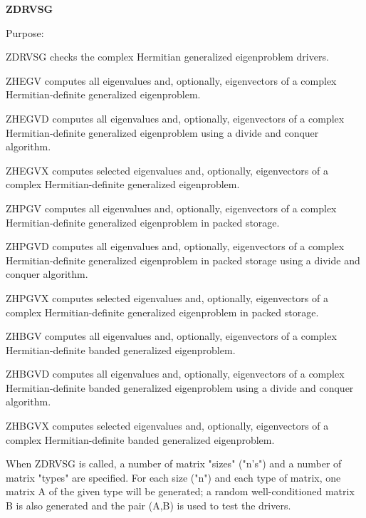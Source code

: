 {\bfseries Z\+D\+R\+V\+S\+G} 

\begin{DoxyParagraph}{Purpose\+: }
\begin{DoxyVerb}      ZDRVSG checks the complex Hermitian generalized eigenproblem
      drivers.

              ZHEGV computes all eigenvalues and, optionally,
              eigenvectors of a complex Hermitian-definite generalized
              eigenproblem.

              ZHEGVD computes all eigenvalues and, optionally,
              eigenvectors of a complex Hermitian-definite generalized
              eigenproblem using a divide and conquer algorithm.

              ZHEGVX computes selected eigenvalues and, optionally,
              eigenvectors of a complex Hermitian-definite generalized
              eigenproblem.

              ZHPGV computes all eigenvalues and, optionally,
              eigenvectors of a complex Hermitian-definite generalized
              eigenproblem in packed storage.

              ZHPGVD computes all eigenvalues and, optionally,
              eigenvectors of a complex Hermitian-definite generalized
              eigenproblem in packed storage using a divide and
              conquer algorithm.

              ZHPGVX computes selected eigenvalues and, optionally,
              eigenvectors of a complex Hermitian-definite generalized
              eigenproblem in packed storage.

              ZHBGV computes all eigenvalues and, optionally,
              eigenvectors of a complex Hermitian-definite banded
              generalized eigenproblem.

              ZHBGVD computes all eigenvalues and, optionally,
              eigenvectors of a complex Hermitian-definite banded
              generalized eigenproblem using a divide and conquer
              algorithm.

              ZHBGVX computes selected eigenvalues and, optionally,
              eigenvectors of a complex Hermitian-definite banded
              generalized eigenproblem.

      When ZDRVSG is called, a number of matrix "sizes" ("n's") and a
      number of matrix "types" are specified.  For each size ("n")
      and each type of matrix, one matrix A of the given type will be
      generated; a random well-conditioned matrix B is also generated
      and the pair (A,B) is used to test the drivers.


\end{DoxyVerb}
\end{DoxyParagraph}
